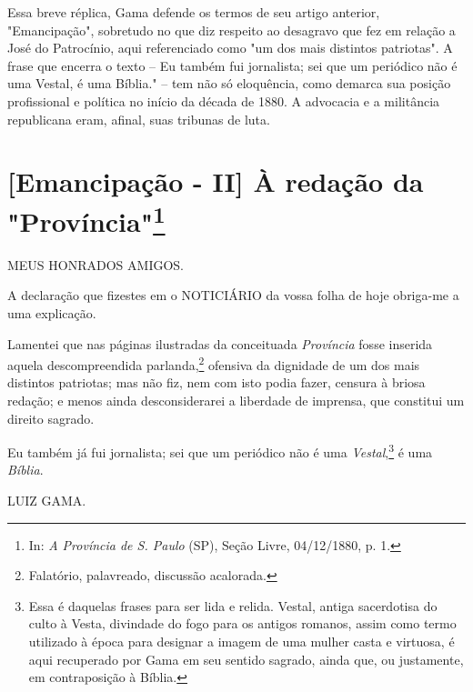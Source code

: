 {\small\noindent
Essa breve réplica, Gama defende os termos de seu artigo anterior,
"Emancipação", sobretudo no que diz respeito ao desagravo que fez em
relação a José do Patrocínio, aqui referenciado como "um dos mais
distintos patriotas". A frase que encerra o texto -- Eu também fui
jornalista; sei que um periódico não é uma Vestal, é uma Bíblia." -- tem
não só eloquência, como demarca sua posição profissional e política no
início da década de 1880. A advocacia e a militância republicana eram,
afinal, suas tribunas de luta.}

\chapter{{[}Emancipação - II{]} À redação da "Província"\footnote[*]{
  In: \emph{A Província de S. Paulo} (SP), Seção Livre, 04/12/1880, p.
  1.}}


MEUS HONRADOS AMIGOS.

A declaração que fizestes em o NOTICIÁRIO da vossa folha de hoje
obriga-me a uma explicação.

Lamentei que nas páginas ilustradas da conceituada \emph{Província}
fosse inserida aquela descompreendida parlanda,\footnote{Falatório,
  palavreado, discussão acalorada.} ofensiva da dignidade de um dos mais
distintos patriotas; mas não fiz, nem com isto podia fazer, censura à
briosa redação; e menos ainda desconsiderarei a liberdade de imprensa,
que constitui um direito sagrado.

Eu também já fui jornalista; sei que um periódico não é uma
\emph{Vestal},\footnote{Essa é daquelas frases para ser lida e relida.
  Vestal, antiga sacerdotisa do culto à Vesta, divindade do fogo para os
  antigos romanos, assim como termo utilizado à época para designar a
  imagem de uma mulher casta e virtuosa, é aqui recuperado por Gama em
  seu sentido sagrado, ainda que, ou justamente, em contraposição à
  Bíblia.} é uma
\emph{Bíblia}.

LUIZ GAMA.

\pagebreak
\mbox{}\vfill
\thispagestyle{empty}

